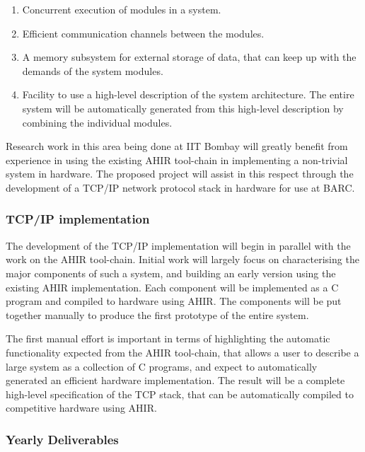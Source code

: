 \documentclass[12pt]{article}
\begin{document}
\begin{enumerate}
\item Concurrent execution of modules in a system.
\item Efficient communication channels between the modules.
\item A memory subsystem for external storage of data, that can keep
  up with the demands of the system modules.
\item Facility to use a high-level description of the system
  architecture. The entire system will be automatically generated from
  this high-level description by combining the individual modules.
\end{enumerate}

Research work in this area being done at IIT Bombay will greatly
benefit from experience in using the existing AHIR tool-chain in
implementing a non-trivial system in hardware. The proposed project
will assist in this respect through the development of a TCP/IP
network protocol stack in hardware for use at BARC.

\subsubsection*{TCP/IP implementation}

The development of the TCP/IP implementation will begin in parallel
with the work on the AHIR tool-chain. Initial work will largely focus
on characterising the major components of such a system, and building
an early version using the existing AHIR implementation. Each
component will be implemented as a C program and compiled to hardware
using AHIR. The components will be put together manually to produce
the first prototype of the entire system.

The first manual effort is important in terms of highlighting the
automatic functionality expected from the AHIR tool-chain, that allows
a user to describe a large system as a collection of C programs, and
expect to automatically generated an efficient hardware
implementation. The result will be a complete high-level specification
of the TCP stack, that can be automatically compiled to competitive
hardware using AHIR.

\subsubsection*{Yearly Deliverables}
\end{document}
